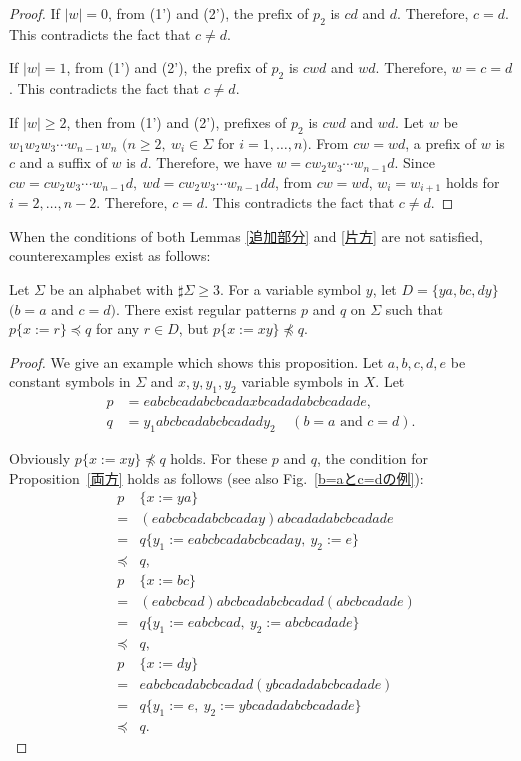 \begin{proof}
%
If $|w|=0$, from (1') and (2'), the prefix of $p_{2}$ is $cd$ and $d$.
Therefore, $c=d$. This contradicts the fact that $c \not = d$.

If $|w|=1$, from (1') and (2'), the prefix of $p_{2}$ is $cwd$ and $wd$.
Therefore, $w=c=d$.
This contradicts the fact that $c \not = d$.

If $|w| \ge 2$, then from (1') and (2'),  prefixes of $p_{2}$ is $cwd$ and $wd$.
Let $w$ be $w_{1}w_{2}w_{3} \cdots w_{n-1}w_{n}$ $(n\geq 2,~w_{i}\in\Sigma$ for $i=1, \ldots , n)$.
From $cw=wd$, a prefix of $w$ is $c$ and a suffix of $w$ is $d$.
Therefore, we have $w=cw_{2}w_{3} \cdots w_{n-1}d$.
Since $cw=cw_{2}w_{3} \cdots w_{n-1}d,~wd=cw_{2}w_{3} \cdots w_{n-1}dd$, from $cw=wd$, $w_{i}=w_{i+1}$ holds for $i=2, \ldots , n-2$.
Therefore, $c=d$. This contradicts the fact that $c \not = d$.
\end{proof}

When the conditions of both Lemmas \ref{追加部分} and \ref{片方} are not satisfied, counterexamples exist as follows:

\begin{prop}\label{両方}
  Let $\Sigma$ be an alphabet with $\sharp \Sigma \ge 3$.
  For a variable symbol $y$, let $D= \{ ya, bc, dy \}$ $(b = a$ and $c = d)$. There exist regular patterns $p$ and $q$ on $\Sigma$ such that $p \{ x := r \} \preceq q$ for any $r \in D$, but $p \{ x := xy \} \not \preceq q$.
\end{prop}

\begin{proof}
We give an example which shows this proposition.
Let $a,b,c,d,e$ be constant symbols in $\Sigma$ and 
$x,y,y_{1},y_{2}$ variable symbols in $X$.
Let 
\begin{align*}
p &= eabcbcadabcbcadaxbcadadabcbcadade,\\
q &= y_{1}abcbcadabcbcadady_{2}~~~~~(b = a\mbox{~and~}c = d).
\end{align*}

\noindent
Obviously $p \{ x:=xy \} \not \preceq q$ holds.
For these $p$ and $q$, the condition for Proposition~\ref{両方} holds as follows (see also Fig.~\ref{b=aとc=dの例}):
\begin{eqnarray*}
&p& \{ x:=ya \} \\ 
& = & (eabcbcadabcbcaday)abcadadabcbcadade\\
& = & q \{ y_{1} := eabcbcadabcbcaday,~y_{2}:=e \} \\
& \preceq & q,\\
&p& \{ x:=bc \}  \\
& = & (eabcbcad)abcbcadabcbcadad(abcbcadade) \\
& = & q \{ y_{1} := eabcbcad,~y_{2} := abcbcadade \} \\
& \preceq & q,\\
&p& \{ x:=dy \}  \\
& = & eabcbcadabcbcadad(ybcadadabcbcadade) \\
& = & q \{ y_{1}:=e,~y_{2} := ybcadadabcbcadade \} \\
& \preceq & q.
\end{eqnarray*}
\end{proof}

